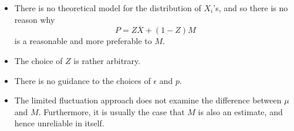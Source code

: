 \documentclass[notoc,notitlepage]{tufte-book}
\begin{document}
\begin{itemize}
  \item There is no theoretical model for the distribution of $X_i$'s, and so
    there is no reason why
    \begin{equation*}
      P = Z \overline{X} + (1 - Z) M
    \end{equation*}
    is a reasonable and more preferable to $M$.
  \item The choice of $Z$ is rather arbitrary.
  \item There is no guidance to the choices of $\epsilon$ and $p$.
  \item The limited fluctuation approach does not examine the difference between
    $\mu$ and $M$. Furthermore, it is usually the case that $M$ is also an
    estimate, and hence unreliable in itself.
\end{itemize}





\appendix

\backmatter

\fancyhead[LE]{\thepage \enspace \textsl{\leftmark}}



\printindex
\end{document}
